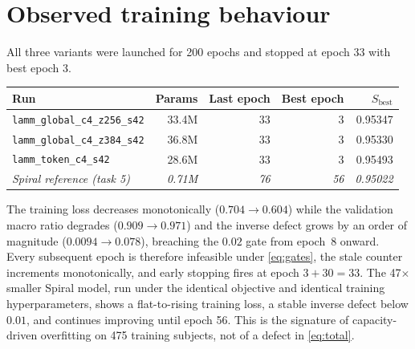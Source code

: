 \documentclass[11pt]{article}
\begin{document}
\section{Observed training behaviour}

All three variants were launched for 200 epochs and stopped at epoch 33 with best epoch 3.

\begin{center}
\begin{tabular}{lrrrr}
\toprule
Run & Params & Last epoch & Best epoch & $S_{\mathrm{best}}$ \\
\midrule
\texttt{lamm\_global\_c4\_z256\_s42} & 33.4M & 33 & 3 & 0.95347 \\
\texttt{lamm\_global\_c4\_z384\_s42} & 36.8M & 33 & 3 & 0.95330 \\
\texttt{lamm\_token\_c4\_s42}        & 28.6M & 33 & 3 & 0.95493 \\
\midrule
\textit{Spiral reference (task 5)}   & \textit{0.71M} & \textit{76} & \textit{56} & \textit{0.95022} \\
\bottomrule
\end{tabular}
\end{center}

The training loss decreases monotonically ($0.704 \to 0.604$) while the validation macro
ratio degrades ($0.909 \to 0.971$) and the inverse defect grows by an order of magnitude
($0.0094 \to 0.078$), breaching the $0.02$ gate from epoch~8 onward. Every subsequent epoch
is therefore infeasible under \eqref{eq:gates}, the stale counter increments monotonically,
and early stopping fires at epoch $3 + 30 = 33$. The 47$\times$ smaller Spiral model, run
under the identical objective and identical training hyperparameters, shows a flat-to-rising
training loss, a stable inverse defect below $0.01$, and continues improving until epoch 56.
This is the signature of capacity-driven overfitting on 475 training subjects, not of a
defect in \eqref{eq:total}.
\end{document}

